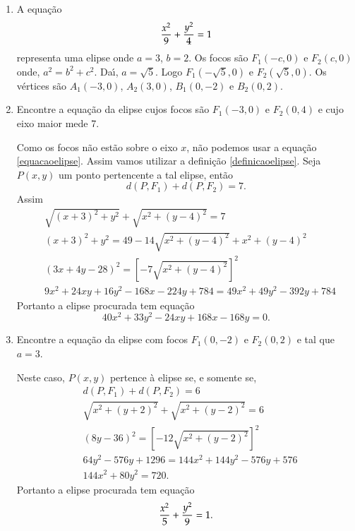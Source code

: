 \begin{exemplos}
  \begin{enumerate}
    \item A equa\c{c}\~ao
    \[
      \dfrac{x^2}{9} + \dfrac{y^2}{4} = 1
    \]
    representa uma elipse onde $a = 3$, $b = 2$. Os focos s\~ao $F_1(-c,0)$ e $F_2(c,0)$ onde, $a^2 = b^2 + c^2$. Da{\'\i}, $a = \sqrt{5}$. Logo $F_1(-\sqrt{5},0)$ e $F_2(\sqrt{5},0)$. Os v\'ertices s\~ao $A_1(-3,0)$, $A_2(3,0)$, $B_1(0,-2)$ e $B_2(0,2)$.
    \item Encontre a equa\c{c}\~ao da elipse cujos focos s\~ao $F_1(-3,0)$ e $F_2(0,4)$ e cujo eixo maior mede 7.
    \begin{solucao}
      Como os focos n\~ao est\~ao sobre o eixo $x$, n\~ao podemos usar a equa\c{c}\~ao \eqref{equacaoelipse}. Assim vamos utilizar a defini\c{c}\~ao \eqref{definicaoelipse}. Seja $P(x,y)$ um ponto pertencente a tal elipse, ent\~ao
      \[
        d(P,F_1) + d(P,F_2) = 7.
      \]
      Assim
      \begin{align*}
        &\sqrt{(x + 3)^2 + y^2} + \sqrt{x^2 + (y - 4)^2} = 7\\
        &(x+ 3)^2 + y^2 = 49 - 14\sqrt{x^2 + (y - 4)^2} + x^2 + (y - 4)^2\\
        &(3x + 4y - 28)^2 = \left[-7\sqrt{x^2 + (y - 4)^2}\right]^2\\
        &9x^2 + 24xy + 16y^2 - 168x - 224y + 784 = 49x^2 + 49y^2 - 392y + 784
      \end{align*}
      Portanto a elipse procurada tem equa\c{c}\~ao
      \[
        40x^2 + 33y^2 - 24xy + 168x - 168y = 0.
      \]
    \end{solucao}
    \item Encontre a equa\c{c}\~ao da elipse com focos $F_1(0,-2)$ e $F_2(0,2)$ e tal que $a = 3$.
    \begin{solucao}
      Neste caso, $P(x,y)$ pertence \`a elipse se, e somente se,
      \begin{align*}
        &d(P,F_1) + d(P,F_2) = 6\\
        &\sqrt{x^2 + (y + 2)^2} + \sqrt{x^2 + (y - 2)^2} = 6\\
        &(8y - 36)^2 = \left[-12\sqrt{x^2 + (y - 2)^2}\right]^2\\
        &64y^2 - 576y + 1296 = 144x^2 + 144y^2 - 576y + 576\\
        &144x^2 + 80y^2 = 720.
      \end{align*}
      Portanto a elipse procurada tem equa\c{c}\~ao
      \[
        \dfrac{x^2}{5} + \dfrac{y^2}{9} = 1.
      \]
    \end{solucao}
  \end{enumerate}
\end{exemplos}

